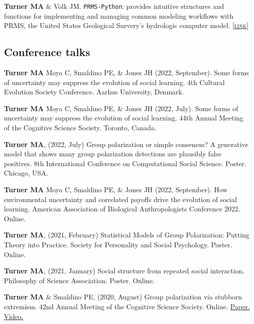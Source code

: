 \documentclass[11pt, letterpaper]{article}
\newcommand{\lurl}[1]{\href{#1}{\scriptsize\textsc{[link]}}}
\begin{document}
\textbf{Turner MA} \& Volk JM. \texttt{PRMS-Python}: provides intuitive
structures and functions for implementing and managing common modeling
workflows with PRMS, the United States Geological Survery’s hydrologic computer
model. \lurl{https://prms-python.github.io/PRMS-Python/build/html/index.html}

\subsection{Conference talks}

    \textbf{Turner MA} Moya C, Smaldino PE, \& Jones JH (2022, September). Some forms of
    uncertainty may suppress the evolution of social learning. 4th Cultural Evolution Society
    Conference. Aarhus University, Denmark. 

    \textbf{Turner MA} Moya C, Smaldino PE, \& Jones JH (2022, July). Some forms of
    uncertainty may suppress the evolution of social learning. 44th Annual Meeting of the
    Cognitive Science Society. Toronto, Canada. 

    \textbf{Turner MA}, (2022, July) Group polarization or simple consensus?
    A generative model that shows many group polarization detections are
    plausibly false positives. 8th International Conference on Computational
    Social Science. Poster. Chicago, USA.

 \textbf{Turner MA} Moya C, Smaldino PE, \& Jones JH (2022, September). How
 environmental uncertainty and correlated payoffs drive the evolution of social
 learning. American Association of Biological Anthropologists Conference 2022.
 Online.

    \textbf{Turner MA}, (2021, February) Statistical Models of Group Polarization: Putting Theory into Practice. Society for Personality and Social Psychology. Poster. Online.

    \textbf{Turner MA}, (2021, January) Social structure from repeated social interaction. Philosophy of Science Association. Poster. Online.

    \textbf{Turner MA} \& Smaldino PE, (2020, August) Group polarization via stubborn extremism. 42nd Annual Meeting of the Cognitive Science Society. Online. \href{https://www.researchgate.net/publication/342153646_Stubborn_extremism_as_a_potential_pathway_to_group_polarization}{Paper.} \href{https://youtu.be/i5PHjwu1p40}{Video.}
\end{document}
